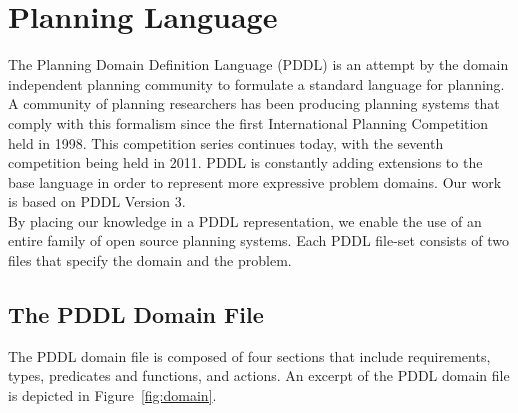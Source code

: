 
\section{Planning Language}\label{S:PDDL}
The Planning Domain Definition Language (PDDL) \cite{PDDL} is an attempt by the domain independent planning community to formulate a standard language for planning. A community of planning researchers has been producing planning systems that comply with this formalism since the first International Planning Competition held in 1998. This competition series
continues today, with the seventh competition being held in 2011. PDDL is constantly adding extensions to the base language in order to represent more expressive problem domains. Our work is based on PDDL Version 3.\\
By placing our knowledge in a PDDL representation, we enable the use of an entire family of open source planning systems.
Each PDDL file-set consists of two files that specify the domain and the problem.

\subsection{The PDDL Domain File}\label{S:PDDL-domain}
The PDDL domain file is composed of four sections that include requirements, types, predicates and functions, and actions. An excerpt of the PDDL domain file is depicted in Figure~\ref{fig:domain}.

